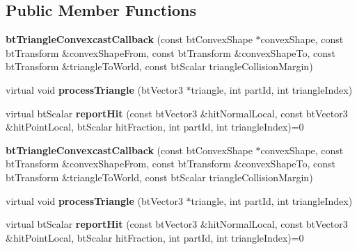 \subsection*{Public Member Functions}
\begin{DoxyCompactItemize}
\item 
\mbox{\label{classbtTriangleConvexcastCallback_ae34f524d20db09e0c81f7f98afc77497}} 
{\bfseries bt\+Triangle\+Convexcast\+Callback} (const bt\+Convex\+Shape $\ast$convex\+Shape, const bt\+Transform \&convex\+Shape\+From, const bt\+Transform \&convex\+Shape\+To, const bt\+Transform \&triangle\+To\+World, const bt\+Scalar triangle\+Collision\+Margin)
\item 
\mbox{\label{classbtTriangleConvexcastCallback_a2927a686e707e8ed885433f120bc5e32}} 
virtual void {\bfseries process\+Triangle} (bt\+Vector3 $\ast$triangle, int part\+Id, int triangle\+Index)
\item 
\mbox{\label{classbtTriangleConvexcastCallback_a74bdd1264324629f7f44e305ec3187a2}} 
virtual bt\+Scalar {\bfseries report\+Hit} (const bt\+Vector3 \&hit\+Normal\+Local, const bt\+Vector3 \&hit\+Point\+Local, bt\+Scalar hit\+Fraction, int part\+Id, int triangle\+Index)=0
\item 
\mbox{\label{classbtTriangleConvexcastCallback_ae34f524d20db09e0c81f7f98afc77497}} 
{\bfseries bt\+Triangle\+Convexcast\+Callback} (const bt\+Convex\+Shape $\ast$convex\+Shape, const bt\+Transform \&convex\+Shape\+From, const bt\+Transform \&convex\+Shape\+To, const bt\+Transform \&triangle\+To\+World, const bt\+Scalar triangle\+Collision\+Margin)
\item 
\mbox{\label{classbtTriangleConvexcastCallback_a9878a9e4cd3d386bb635520f2a96d542}} 
virtual void {\bfseries process\+Triangle} (bt\+Vector3 $\ast$triangle, int part\+Id, int triangle\+Index)
\item 
\mbox{\label{classbtTriangleConvexcastCallback_a74bdd1264324629f7f44e305ec3187a2}} 
virtual bt\+Scalar {\bfseries report\+Hit} (const bt\+Vector3 \&hit\+Normal\+Local, const bt\+Vector3 \&hit\+Point\+Local, bt\+Scalar hit\+Fraction, int part\+Id, int triangle\+Index)=0
\end{DoxyCompactItemize}
